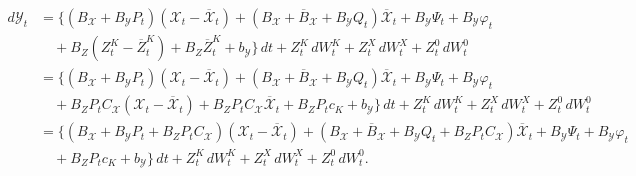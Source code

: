 \documentclass[10pt,a4paper]{amsart}
\numberwithin{equation}{section}
\begin{document}
\begin{align}\label{eq:fin_coef_dY}
    d{\mathcal{Y}}_t 
    & = \Big\{(B_{\mathcal{X}}+B_{\mathcal{Y}} {P}_t) ({\mathcal{X}}_t - \overline{{\mathcal{X}}}_t) + (B_{\mathcal{X}}+\overline{B}_{\mathcal{X}}+   B_{\mathcal{Y}} Q_t) \overline{{\mathcal{X}}}_t +   B_{\mathcal{Y}}  \Psi_t +  B_{\mathcal{Y}}\varphi_t \\ 
    &\nonumber \quad + B_Z ({Z}^K_t-\overline{Z}^K_t) + B_Z \overline{Z}^K_t + b_\mathcal{Y}\Big\}\,dt + {Z}^K_t\,d{W}_t^{K} + {Z}^X_t\,dW_t^{X}+ {Z}^0_t\,dW_t^{0}\\  
    & \nonumber= \Big\{(B_{\mathcal{X}}+B_{\mathcal{Y}} {P}_t) ({\mathcal{X}}_t - \overline{{\mathcal{X}}}_t) + (B_{\mathcal{X}}+\overline{B}_{\mathcal{X}}+   B_{\mathcal{Y}} Q_t) \overline{{\mathcal{X}}}_t +   B_{\mathcal{Y}} \Psi_t + B_{\mathcal{Y}}\varphi_t \\  
    &\nonumber \quad + B_Z {P}_t C_{\mathcal{X}}({\mathcal{X}}_t - \overline{{\mathcal{X}}}_t) + B_Z {P}_t C_{\mathcal{X}} \overline{{\mathcal{X}}}_t + B_Z P_tc_K + b_\mathcal{Y}\Big\}\,dt + {Z}^K_t\,d{W}_t^{K} + {Z}^X_t\,dW_t^{X}+ {Z}^0_t\,dW_t^{0}\\
    &\nonumber = \Big\{(B_{\mathcal{X}}+B_{\mathcal{Y}} {P}_t  + B_Z {P}_t C_{\mathcal{X}}) ({\mathcal{X}}_t - \overline{{\mathcal{X}}}_t) + (B_{\mathcal{X}}+\overline{B}_{\mathcal{X}}+   B_{\mathcal{Y}} Q_t + B_Z {P}_t C_{\mathcal{X}} ) \overline{{\mathcal{X}}}_t + B_{\mathcal{Y}}  \Psi_t + B_{\mathcal{Y}}\varphi_t \\  
    &\nonumber \quad + B_Z P_tc_K + b_\mathcal{Y}\Big\}\,dt + {Z}^K_t\,d{W}_t^{K} + {Z}^X_t\,dW_t^{X}+ {Z}^0_t\,dW_t^{0}.
\end{align}
\end{document}
